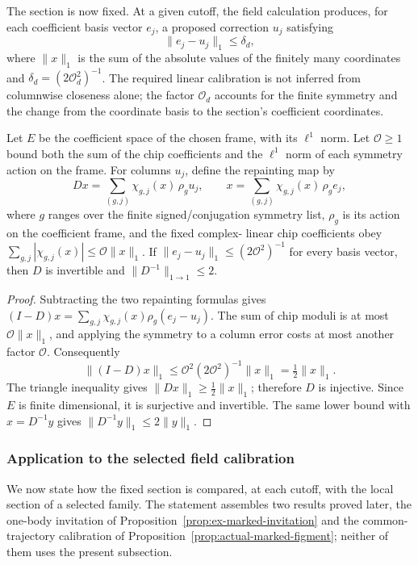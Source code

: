 The section is now fixed. At a given cutoff, the field calculation
produces, for each coefficient basis vector $e_j$, a proposed correction
$u_j$ satisfying
\[
        \|e_j-u_j\|_1\leq\delta_d,
\]
where $\|x\|_1$ is the sum of the absolute values of the finitely many
coordinates and $\delta_d=(2\mathcal O_d^2)^{-1}$. The required linear
calibration is not inferred from columnwise closeness alone; the factor
$\mathcal O_d$ accounts for the finite symmetry and the change from the
coordinate basis to the section's coefficient coordinates.

\begin{lemma}
\label{lem:ex-marked-calibration-inverse}
Let $E$ be the coefficient space of the chosen frame, with its $\ell^1$
norm. Let $\mathcal O\geq1$ bound both the sum of the chip coefficients
and the $\ell^1$ norm of each symmetry action on the frame. For columns
$u_j$, define the repainting map by
\[
 D x=\sum_{(g,j)}\chi_{g,j}(x)\,\rho_g u_j,
 \qquad
 x=\sum_{(g,j)}\chi_{g,j}(x)\,\rho_g e_j,
\]
where $g$ ranges over the finite signed/conjugation symmetry list,
$\rho_g$ is its action on the coefficient frame, and the fixed complex-
linear chip coefficients obey
$\sum_{g,j}|\chi_{g,j}(x)|\leq\mathcal O\|x\|_1$.
If $\|e_j-u_j\|_1\leq(2\mathcal O^2)^{-1}$ for every basis vector,
then $D$ is invertible and $\|D^{-1}\|_{1\to1}\leq2$.
\end{lemma}
\begin{proof}
Subtracting the two repainting formulas gives
$(I-D)x=\sum_{g,j}\chi_{g,j}(x)\rho_g(e_j-u_j)$.
The sum of chip moduli is at most $\mathcal O\|x\|_1$, and applying
the symmetry to a column error costs at most another factor $\mathcal O$.
Consequently
\[
       \|(I-D)x\|_1\leq\mathcal O^2(2\mathcal O^2)^{-1}\|x\|_1
                         =\tfrac12\|x\|_1.
\]
The triangle inequality gives $\|Dx\|_1\geq\frac12\|x\|_1$;
therefore $D$ is injective. Since $E$ is finite dimensional, it is
surjective and invertible. The same lower bound with $x=D^{-1}y$ gives
$\|D^{-1}y\|_1\leq2\|y\|_1$.
\end{proof}

\subsubsection{Application to the selected field calibration}

We now state how the fixed section is compared, at each cutoff, with the
local section of a selected family. The statement assembles two results
proved later, the one-body invitation of
Proposition~\ref{prop:ex-marked-invitation} and the common-trajectory
calibration of Proposition~\ref{prop:actual-marked-figment}; neither of
them uses the present subsection.

